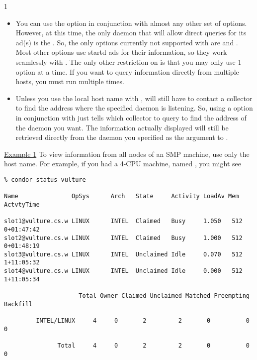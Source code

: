 \begin{ManPage}{\label{man-condor-status}}{1}
\begin{itemize}
	\item You can use the  option in conjunction with
	almost any other set of options.
	However, at this time, the only daemon that will allow direct
	queries for its ad(s) is the .
	So, the only options currently not supported with
	 are  and .
	Most other options use startd ads for their information, so
	they work seamlessly with .
	The only other restriction on  is that you may
	only use 1  option at a time.
	If you want to query information directly from multiple hosts,
	you must run  multiple times.

	\item Unless you use the local host name with ,
	 will still have to contact a collector to find
	the address where the specified daemon is listening.
	So, using a  option in conjunction with
	 just tells  which collector to
	query to find the address of the daemon you want.
	The information actually displayed will still be retrieved
	directly from the daemon you specified as the argument to
	.

\end{itemize}

\Examples

\underline{Example 1} To view information from all nodes of an SMP
machine, use only the host name.
For example, if you had a 4-CPU machine, named
, you might see
\footnotesize
\begin{verbatim}
% condor_status vulture

Name               OpSys      Arch   State     Activity LoadAv Mem   ActvtyTime

slot1@vulture.cs.w LINUX      INTEL  Claimed   Busy     1.050   512  0+01:47:42
slot2@vulture.cs.w LINUX      INTEL  Claimed   Busy     1.000   512  0+01:48:19
slot3@vulture.cs.w LINUX      INTEL  Unclaimed Idle     0.070   512  1+11:05:32
slot4@vulture.cs.w LINUX      INTEL  Unclaimed Idle     0.000   512  1+11:05:34

                     Total Owner Claimed Unclaimed Matched Preempting Backfill

         INTEL/LINUX     4     0       2         2       0          0        0

               Total     4     0       2         2       0          0        0
\end{verbatim}
\normalsize



\end{ManPage}

